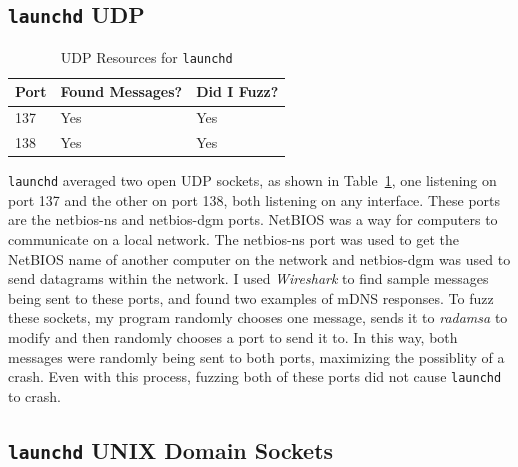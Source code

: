 \subsection{\texttt{launchd} UDP}
\label{sec:launchdUdp}

\begin{table}
\centering
\begin{normalsize}
\begin{tabular}{ l | l | l }
\textbf{Port} & \textbf{Found Messages?} & \textbf{Did I Fuzz?} \\ \hline
137 & Yes & Yes \\ \hline
138 & Yes & Yes \\ \hline
\end{tabular}
\caption{UDP Resources for \texttt{launchd}}
\label{tab:launchdUdpTab}
\end{normalsize}
\end{table} 

\texttt{launchd} averaged two open UDP sockets, as shown in Table~\ref{tab:launchdUdpTab}, one listening on port 137 and the other on port 138, both listening on any interface.  These ports are the netbios-ns and netbios-dgm ports.  NetBIOS was a way for computers to communicate on a local network.  The netbios-ns port was used to get the NetBIOS name of another computer on the network and netbios-dgm was used to send datagrams within the network.  I used \textit{Wireshark} to find sample messages being sent to these ports, and found two examples of mDNS responses.  To fuzz these sockets, my program randomly chooses one message, sends it to \textit{radamsa} to modify and then randomly chooses a port to send it to.  In this way, both messages were randomly being sent to both ports, maximizing the possiblity of a crash.  Even with this process, fuzzing both of these ports did not cause \texttt{launchd} to crash.

\subsection{\texttt{launchd} UNIX Domain Sockets}
\label{sec:launchdUnix}


